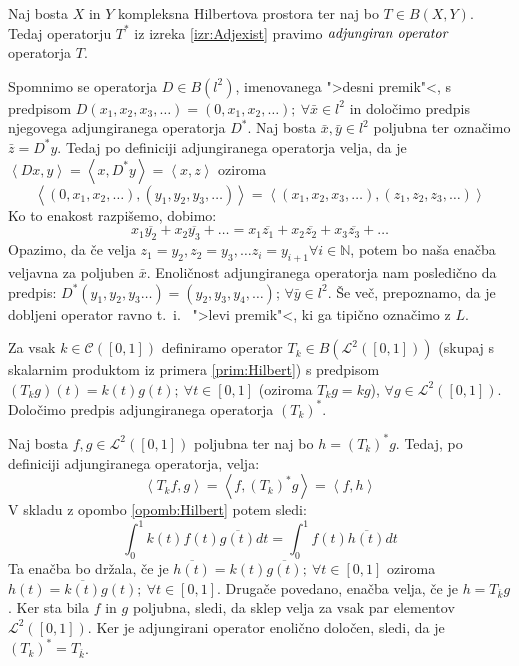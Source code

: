 \documentclass[mat2]{matdelo}
\newcommand{\N}{\mathbb{N}}
\newcommand{\pojem}[1]{\ensuremath{\emph{#1}}}
\newcommand{\Sp}[2]{\ensuremath{\left<#1, #2\right>}}
\begin{document}
			\begin{definicija}
				\label{def:adjop}
				Naj bosta $X$ in $Y$ kompleksna Hilbertova prostora ter naj bo $T\in B(X, Y)$. Tedaj operatorju $T^*$ iz izreka \ref{izr:Adjexist} pravimo \pojem{adjungiran operator} operatorja $T$.
			\end{definicija}
			
			\begin{primer}
				\label{prim:adjop1} Spomnimo se operatorja $D\in B(l^2)$, imenovanega ">desni premik"<, s predpisom $D(x_1, x_2, x_3, \ldots) = (0, x_1, x_2, \ldots);~\forall \bar{x}\in l^2$ in določimo predpis njegovega adjungiranega operatorja $D^*$. Naj bosta $\bar{x}, \bar{y}\in l^2$ poljubna ter označimo $\bar{z} = D^*y$. Tedaj po definiciji adjungiranega operatorja velja, da je $\Sp{Dx}{y} = \Sp{x}{D^*y} = \Sp{x}{z}$ oziroma $$\Sp{(0, x_1, x_2, \ldots)}{(y_1, y_2, y_3, \ldots)}=\Sp{(x_1, x_2, x_3, \ldots)}{(z_1, z_2, z_3, \ldots)}$$
				Ko to enakost razpišemo, dobimo: $$x_1\overline{y_2}+x_2\overline{y_3} + \ldots = x_1\overline{z_1} + x_2\overline{z_2}+x_3\overline{z_3} + \ldots$$
				Opazimo, da če velja $z_1 = y_2, z_2 = y_3, \ldots z_i = y_{i+1}\forall i\in \N$, potem bo naša enačba veljavna za poljuben $\bar{x}$. Enoličnost adjungiranega operatorja nam posledično da predpis: $D^*(y_1, y_2, y_3 \ldots) = (y_2, y_3, y_4, \ldots)$; $\forall \bar{y}\in l^2$. Še več, prepoznamo, da je dobljeni operator ravno t.~i.~ ">levi premik"<, ki ga tipično označimo z $L$.
			\end{primer}
			
			\begin{primer}
				\label{prim:adjop2} Za vsak $k\in \mathcal{C}([0, 1])$ definiramo operator $T_k\in B(\mathcal{L}^2([0, 1]))$ (skupaj s skalarnim produktom iz primera \ref{prim:Hilbert}) s predpisom $(T_kg)(t) = k(t)g(t);~\forall t\in [0, 1]$ (oziroma $T_kg = kg$), $\forall g\in \mathcal{L}^2([0, 1])$. Določimo predpis adjungiranega operatorja $(T_k)^*$.
				
				Naj bosta $f, g \in \mathcal{L}^2([0, 1])$ poljubna ter naj bo $h = (T_k)^*g$. Tedaj, po definiciji adjungiranega operatorja, velja: $$\Sp{T_kf}{g} = \Sp{f}{(T_k)^*g} = \Sp{f}{h}$$
				V skladu z opombo \ref{opomb:Hilbert} potem sledi: $$\int_{0}^{1}k(t)f(t)\overline{g(t)}dt = \int_{0}^{1}f(t)\overline{h(t)}dt$$
				Ta enačba bo držala, če je $\overline{h(t)} = k(t)\overline{g(t)};~\forall t\in [0, 1]$ oziroma $h(t) = \overline{k(t)}g(t);~\forall t\in [0, 1]$. Drugače povedano, enačba velja, če je $h = T_{\overline{k}}g$. Ker sta bila $f$ in $g$ poljubna, sledi, da sklep velja za vsak par elementov $\mathcal{L}^2([0, 1])$. Ker je adjungirani operator enolično določen, sledi, da je $(T_k)^* = T_{\overline{k}}$.
			\end{primer}
			
\end{document}
